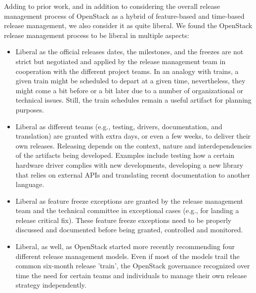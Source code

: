 \documentclass[dvipsnames]{bmcart}
\theoremstyle{definition}
\begin{document}
Adding to prior work, and in addition to considering the overall release management process of OpenStack as a hybrid of feature-based and time-based release management, we also consider it as quite liberal. We found the OpenStack release management process to be liberal in multiple aspects: 
\begin{itemize}
 \item Liberal as the official releases dates, the milestones, and the freezes are not strict but negotiated and applied by the release management team in cooperation with the different project teams. In an analogy with trains, a given train might be scheduled to depart at a given time, nevertheless, they might come a bit before or a bit later due to a number of organizational or technical issues. Still, the train schedules remain a useful artifact for planning purposes. 
 \item Liberal as different teams (e.g., testing, drivers, documentation, and translation) are granted with extra days, or even a few weeks, to deliver their own releases. Releasing depends on the context, nature and interdependencies of the artifacts being developed. Examples include testing how a certain hardware driver complies with new developments, developing a new library that relies on external APIs and translating recent documentation to another language. 
\item Liberal as feature freeze exceptions are granted by the release management team and the technical committee in exceptional cases (e.g., for landing a release critical fix).  These feature freeze exceptions need to be properly discussed and documented before being granted, controlled and monitored. 

\item Liberal, as well, as OpenStack started more recently recommending four different release management models. Even if most of the models trail the common six-month release 'train', the OpenStack governance recognized over time the need for certain teams and individuals to manage their own release strategy independently. 

\end{itemize} 



\end{document}
